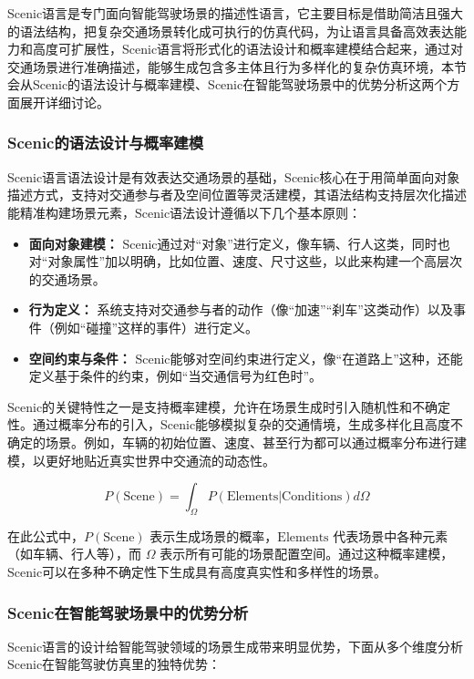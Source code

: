 Scenic语言是专门面向智能驾驶场景的描述性语言，它主要目标是借助简洁且强大的语法结构，把复杂交通场景转化成可执行的仿真代码，为让语言具备高效表达能力和高度可扩展性，Scenic语言将形式化的语法设计和概率建模结合起来，通过对交通场景进行准确描述，能够生成包含多主体且行为多样化的复杂仿真环境，本节会从Scenic的语法设计与概率建模、Scenic在智能驾驶场景中的优势分析这两个方面展开详细讨论。
\subsubsection{Scenic的语法设计与概率建模}

Scenic语言语法设计是有效表达交通场景的基础，Scenic核心在于用简单面向对象描述方式，支持对交通参与者及空间位置等灵活建模，其语法结构支持层次化描述能精准构建场景元素，Scenic语法设计遵循以下几个基本原则：

\begin{itemize}
	\item \textbf{面向对象建模：} Scenic通过对“对象”进行定义，像车辆、行人这类，同时也对“对象属性”加以明确，比如位置、速度、尺寸这些，以此来构建一个高层次的交通场景。
	\item \textbf{行为定义：} 系统支持对交通参与者的动作（像“加速”“刹车”这类动作）以及事件（例如“碰撞”这样的事件）进行定义。
	\item \textbf{空间约束与条件：} Scenic能够对空间约束进行定义，像“在道路上”这种，还能定义基于条件的约束，例如“当交通信号为红色时”。
\end{itemize}

Scenic的关键特性之一是支持概率建模，允许在场景生成时引入随机性和不确定性。通过概率分布的引入，Scenic能够模拟复杂的交通情境，生成多样化且高度不确定的场景。例如，车辆的初始位置、速度、甚至行为都可以通过概率分布进行建模，以更好地贴近真实世界中交通流的动态性。

\begin{equation}
	P(\text{Scene}) = \int_{\Omega} P(\text{Elements} | \text{Conditions}) d\Omega
\end{equation}

在此公式中，$P(\text{Scene})$ 表示生成场景的概率，$\text{Elements}$ 代表场景中各种元素（如车辆、行人等），而 $\Omega$ 表示所有可能的场景配置空间。通过这种概率建模，Scenic可以在多种不确定性下生成具有高度真实性和多样性的场景。

\subsubsection{Scenic在智能驾驶场景中的优势分析}

Scenic语言的设计给智能驾驶领域的场景生成带来明显优势，下面从多个维度分析Scenic在智能驾驶仿真里的独特优势：

